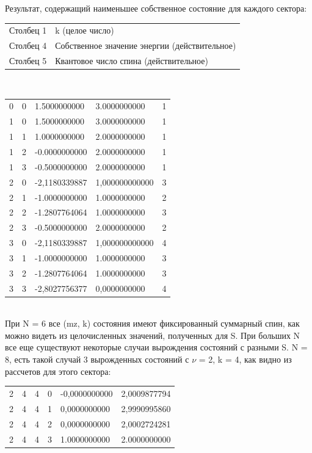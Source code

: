 \documentclass[11pt]{article}
\begin{document}
Результат, содержащий наименьшее собственное состояние для каждого сектора:\\
\begin{tabular}{ll}
Столбец 1 & k (целое число)\\
Столбец 4 & Собственное значение энергии (действительное)\\
Столбец 5 & Квантовое число спина (действительное)\\
\end{tabular} \\

\begin{tabular}{lllll}
    0 & 0 & 1.5000000000 & 3.0000000000 & 1 \\
    1 & 0 & 1.5000000000 & 3.0000000000 & 1 \\
    1 & 1 & 1.0000000000 & 2.0000000000 & 1 \\
    1 & 2 & -0.0000000000 & 2.0000000000 & 1 \\
    1 & 3 & -0.5000000000 & 2.0000000000 & 1 \\
    2 & 0 & -2,1180339887 & 1,000000000000 & 3 \\
    2 & 1 & -1.0000000000 & 1.0000000000 & 2 \\
    2 & 2 & -1.2807764064 & 1.0000000000 & 3 \\
    2 & 3 & -0.5000000000 & 2.0000000000 & 2 \\
    3 & 0 & -2,1180339887 & 1,000000000000 & 4 \\
    3 & 1 & -1.0000000000 & 1.0000000000 & 3 \\
    3 & 2 & -1.2807764064 & 1.0000000000 & 3 \\
    3 & 3 & -2,8027756377 & 0,0000000000 & 4 \\
\end{tabular}\\

При N = 6 все (mz, k) состояния имеют фиксированный суммарный спин, как можно видеть из целочисленных значений, полученных для S. При больших N все еще существуют некоторые случаи вырождения состояний с разными S. N = 8, есть такой случай 3 вырожденных состояний с $\nu$ = 2, k = 4, как видно из рассчетов для этого сектора:\\

\begin{tabular}{llllll}
    2 & 4 & 4 & 0 & -0,0000000000 & 2,0009877794 \\
    2 & 4 & 4 & 1 & 0,0000000000 & 2,9990995860 \\
    2 & 4 & 4 & 2 & 0,0000000000 & 2,0002724281 \\
    2 & 4 & 4 & 3 & 1.0000000000 & 2.0000000000 \\
\end{tabular}
\end{document}
